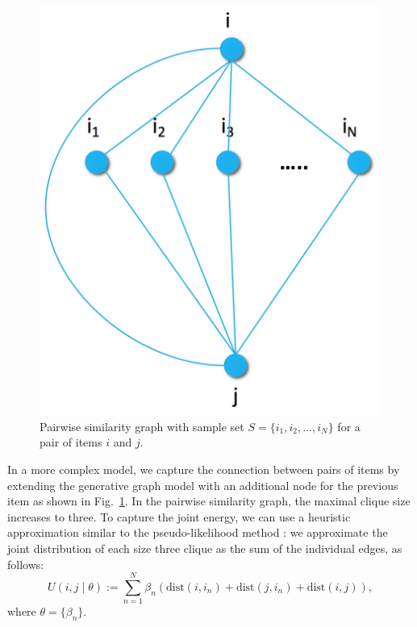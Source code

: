 \documentclass[preprint]{sig-alternate-05-2015}
\begin{document}
\begin{figure}
\centerline{
  \includegraphics[scale=.2]{i2i_joined.png}}

\caption[]{Pairwise similarity graph with sample set $S=\{i_1,i_2,...,i_{N}\}$ for a pair of items $i$ and $j$.}
\label{fig:join}
\end{figure}


In a more complex model, we capture the connection between pairs of items by extending the generative graph model with an additional node for the previous item as shown in Fig.~\ref{fig:join}.  In the pairwise similarity graph, the maximal clique size increases to three. To capture the joint energy, we can use a heuristic approximation similar to the pseudo-likelihood method \cite{besag1975statistical}: we approximate the joint distribution of each size three clique as the sum of the individual edges, as follows:
%
\begin{equation}
\label{eq:potential_joined}
U(i,j \mid \theta) := \sum_{n=1}^{N} \beta_{n} (\mbox{dist}(i,i_n) + \mbox{dist}(j,i_n) + \mbox{dist}(i,j)),
\end{equation}
%
where $\theta = \{\beta_n\}$.
\end{document}
